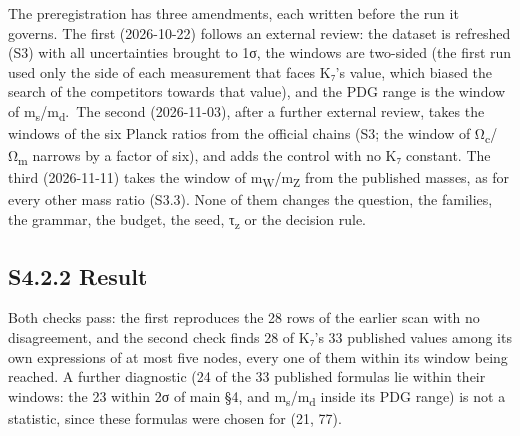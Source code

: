 \documentclass[11pt,a4paper]{article}
\begin{document}
The preregistration has three amendments, each written before the run it governs. The first (2026-10-22) follows an external review: the dataset is refreshed (S3) with all uncertainties brought to 1σ, the windows are two-sided (the first run used only the side of each measurement that faces K₇'s value, which biased the search of the competitors towards that value), and the PDG range is the window of m\textsubscript{s}/m\textsubscript{d}.~The second (2026-11-03), after a further external review, takes the windows of the six Planck ratios from the official chains (S3; the window of Ω\textsubscript{c}/Ω\textsubscript{m} narrows by a factor of six), and adds the control with no K₇ constant. The third (2026-11-11) takes the window of m\textsubscript{W}/m\textsubscript{Z} from the published masses, as for every other mass ratio (S3.3). None of them changes the question, the families, the grammar, the budget, the seed, τ\textsubscript{z} or the decision rule.

\subsection{S4.2.2 Result}\label{s4.2.2-result}

Both checks pass: the first reproduces the 28 rows of the earlier scan with no disagreement, and the second check finds 28 of K₇'s 33 published values among its own expressions of at most five nodes, every one of them within its window being reached. A further diagnostic (24 of the 33 published formulas lie within their windows: the 23 within 2σ of main §4, and m\textsubscript{s}/m\textsubscript{d} inside its PDG range) is not a statistic, since these formulas were chosen for (21, 77).
\end{document}
